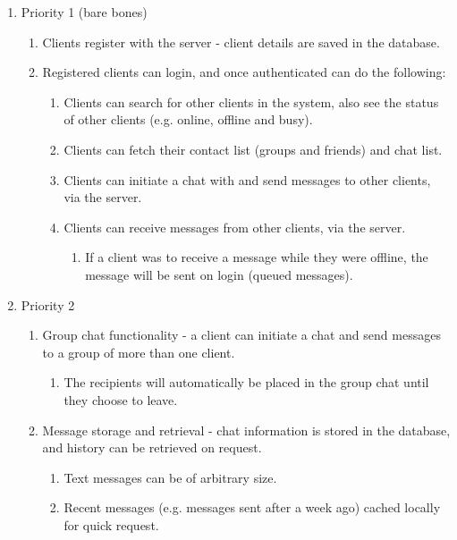 
\begin{enumerate}
\item Priority 1 (bare bones)
\begin{enumerate}[label*=\arabic*.]
\item Clients register with the server - client details are saved in the database.
\item Registered clients can login, and once authenticated can do the following:
\begin{enumerate}[label*=\arabic*.]
\item Clients can search for other clients in the system, also see the status of other clients (e.g. online, offline and busy).

\item Clients can fetch their contact list (groups and friends) and chat list.

\item Clients can initiate a chat with and send messages to other clients, via the server.

\item Clients can receive messages from other clients, via the server. 
\begin{enumerate}[label*=\arabic*.]
\item If a client was to receive a message while they were offline, the message will be sent on login (queued messages).
\end{enumerate}
\end{enumerate}
\end{enumerate}

\item Priority 2
\begin{enumerate}[label*=\arabic*.]
\item  Group chat functionality - a client can initiate a chat and send messages to a group of more than one client.
\begin{enumerate}[label*=\arabic*.]
\item The recipients will automatically be placed in the group chat until they choose to leave.
\end{enumerate}
\item Message storage and retrieval - chat information is stored in the database, and history can be retrieved on request.
\begin{enumerate}[label*=\arabic*.]
\item Text messages can be of arbitrary size.

\item Recent messages (e.g. messages sent after a week ago) cached locally for quick request.


\end{enumerate}
\end{enumerate}
\end{enumerate}

